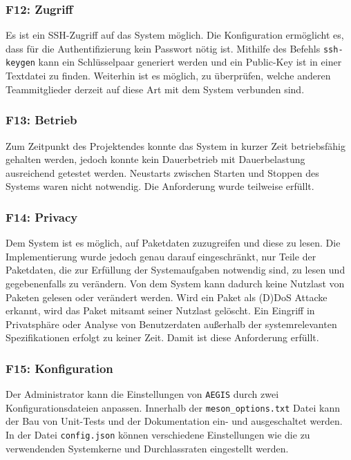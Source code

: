 \documentclass[../review_3.tex]{subfiles}
\begin{document}
\subsubsection{F12: Zugriff}
Es ist ein SSH-Zugriff auf das System möglich. Die Konfiguration ermöglicht es, dass für die Authentifizierung kein Passwort nötig ist. Mithilfe des Befehls \texttt{ssh-keygen} kann ein Schlüsselpaar generiert werden und ein Public-Key ist in einer Textdatei zu finden. Weiterhin ist es möglich, zu überprüfen, welche anderen Teammitglieder derzeit auf diese Art mit dem System verbunden sind.

\subsubsection{F13: Betrieb}
Zum Zeitpunkt des Projektendes konnte das System in kurzer Zeit betriebsfähig gehalten werden, jedoch konnte kein Dauerbetrieb mit Dauerbelastung ausreichend getestet werden. Neustarts zwischen Starten und Stoppen des Systems waren nicht notwendig.
Die Anforderung wurde teilweise erfüllt.

\subsubsection{F14: Privacy}
Dem System ist es möglich, auf Paketdaten zuzugreifen und diese zu lesen. Die Implementierung wurde jedoch genau darauf eingeschränkt, nur Teile der Paketdaten, die zur Erfüllung der Systemaufgaben notwendig sind, zu lesen und gegebenenfalls zu verändern. Von dem System kann dadurch keine Nutzlast von Paketen gelesen oder verändert werden. Wird ein Paket als (D)DoS Attacke erkannt, wird das Paket mitsamt seiner Nutzlast gelöscht. Ein Eingriff in Privatsphäre oder Analyse von Benutzerdaten außerhalb der systemrelevanten Spezifikationen erfolgt zu keiner Zeit. Damit ist diese Anforderung erfüllt.

\subsubsection{F15: Konfiguration}
Der Administrator kann die Einstellungen von \texttt{AEGIS} durch zwei Konfigurationsdateien anpassen. Innerhalb der \texttt{meson\_options.txt} Datei kann der Bau von Unit-Tests und der Dokumentation ein- und ausgeschaltet werden. In der Datei \texttt{config.json} können verschiedene Einstellungen wie die zu verwendenden Systemkerne und Durchlassraten eingestellt werden. 
\end{document}
